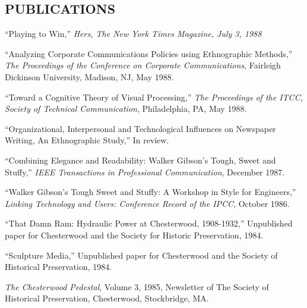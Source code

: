 \documentclass{res}
\begin{document}
\begin{resume}
\section{PUBLICATIONS} 
\vspace{0.1in}
``Playing to Win,'' {\it Hers, The New York Times Magazine, July 3, 1988} 

 
``Analyzing Corporate Communications Policies using Ethnographic 
Methods,'' {\it The Proceedings of the Conference on Corporate 
Communications}, Fairleigh Dickinson University, Madison, NJ, May 
1988. 
 
``Toward a Cognitive Theory of Visual Processing,'' {\it The Proceedings 
of the ITCC, Society of Technical Communication}, Philadelphia, 
PA, May 1988. 
 
``Organizational, Interpersonal and Technological Influences on 
Newspaper Writing, An Ethnographic Study,'' In review. 
 
``Combining Elegance and Readability: Walker Gibson's Tough, Sweet 
and Stuffy,'' {\it IEEE Transactions in Professional Communication}, 
December 1987. 
 
``Walker Gibson's Tough Sweet and Stuffy: A Workshop in Style for 
Engineers,'' {\it Linking Technology and Users: Conference Record of 
the IPCC}, October 1986. 
 
``That Damn Ram: Hydraulic Power at Chesterwood, 1908-1932,'' 
Unpublished paper for Chesterwood and the Society for Historic 
Preservation, 1984. 
 
``Sculpture Media,'' Unpublished paper for Chesterwood and the 
Society of Historical Preservation, 1984. 
 
{\it The Chesterwood Pedestal}, Volume 3, 1985, Newsletter of The 
Society of Historical Preservation, Chesterwood, Stockbridge, MA. 
 
\end{resume}
\end{document}
